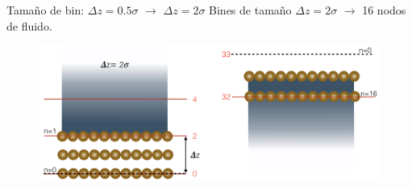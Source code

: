 \documentclass{beamer}
\begin{document}
\begin{frame}{Tamaño de bin: $\Delta z=0.5\sigma$ $\rightarrow$ $\Delta z=2\sigma$}
Bines de tamaño $\Delta z = 2\sigma$ $\rightarrow$ 16 nodos de fluido. 
\begin{figure}[h!]
\includegraphics[width=0.75\linewidth]{bin_size-top-bottom_17nodos_cut}
\end{figure}
\end{frame}

\end{document}
